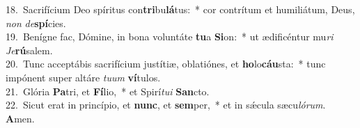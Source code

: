 {18.~}Sacrifícium Deo spíritus con\textbf{tri}bu\textbf{lá}tus:~* cor contrítum et humiliátum, Deus, \textit{non} \textit{de}\textbf{spí}cies.\\
{19.~}Benígne fac, Dómine, in bona voluntáte \textbf{tu}a \textbf{Si}on:~* ut ædificéntur mu\textit{ri} \textit{Je}\textbf{rú}salem.\\
{20.~}Tunc acceptábis sacrifícium justítiæ, oblatiónes, et \textbf{ho}lo\textbf{cáu}sta:~* tunc impónent super altáre \textit{tu}\textit{um} \textbf{ví}tulos.\\
{21.~}Glória \textbf{Pa}tri, et \textbf{Fí}lio,~* et Spirí\textit{tu}\textit{i} \textbf{San}cto.\\
{22.~}Sicut erat in princípio, et \textbf{nunc}, et \textbf{sem}per,~* et in sǽcula sæcu\textit{ló}\textit{rum}. \textbf{A}men.\\
